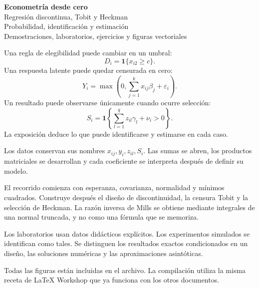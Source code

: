 \documentclass[11pt,a4paper]{article}
\begin{document}
\thispagestyle{empty}
\begin{center}
{\Huge\bfseries\color{azul}Econometría desde cero}\\[10pt]
{\LARGE Regresión discontinua, Tobit y Heckman}\\[10pt]
{\Large Probabilidad, identificación y estimación}\\[8pt]
{\large Demostraciones, laboratorios, ejercicios y figuras vectoriales}
\end{center}
\begin{idea}
Una regla de elegibilidad puede cambiar en un umbral:
\[
D_i=\mathbf1\{x_{i2}\ge c\}.
\]
Una respuesta latente puede quedar censurada en cero:
\[
Y_i=\max\left(0,\sum_{j=1}^kx_{ij}\beta_j+\varepsilon_i\right).
\]
Un resultado puede observarse únicamente cuando ocurre selección:
\[
S_i=\mathbf1\left\{\sum_{l=1}^q z_{il}\gamma_l+\nu_i>0\right\}.
\]
La exposición deduce lo que puede identificarse y estimarse en cada caso.
\end{idea}
Los datos conservan sus nombres \(x_{ij},y_i,z_{il},S_i\).
Las sumas se abren, los productos matriciales se desarrollan
y cada coeficiente se interpreta después de definir su modelo.

El recorrido comienza con esperanza, covarianza, normalidad
y mínimos cuadrados. Construye después el diseño de discontinuidad,
la censura Tobit y la selección de Heckman.
La razón inversa de Mills se obtiene mediante integrales
de una normal truncada, y no como una fórmula que se memoriza.

Los laboratorios usan datos didácticos explícitos.
Los experimentos simulados se identifican como tales.
Se distinguen los resultados exactos condicionados en un diseño,
las soluciones numéricas y las aproximaciones asintóticas.

Todas las figuras están incluidas en el archivo.
La compilación utiliza la misma receta de LaTeX Workshop
que ya funciona con los otros documentos.
\begin{center}
\end{center}
\clearpage\tableofcontents
\end{document}
